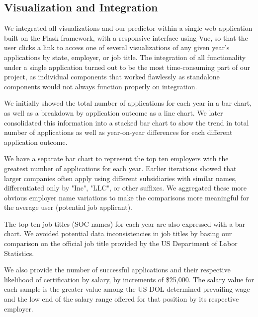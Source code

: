 \documentclass[sigconf]{acmart}
\begin{document}
\subsection{Visualization and Integration}
We integrated all visualizations and our predictor within a single 
web application built on the Flask framework, with a responsive interface using Vue, so that 
the user clicks a link to access one of several visualizations of any given year's applications 
by state, employer, or job title. The integration of all functionality under a single application 
turned out to be the most time-consuming part of our project, as individual components that worked 
flawlessly as standalone components would not always function properly on integration. 

We initially showed the total number of applications for each year in a bar chart, as well as a breakdown by application 
outcome as a line chart. We later consolidated this information into a stacked bar chart to show the trend in total number 
of applications as well as year-on-year differences for each different application outcome. 

We have a separate bar chart to represent the top ten employers with the greatest number of applications for each year. 
Earlier iterations showed that larger companies often apply using different subsidiaries with similar names, 
differentiated only by "Inc", "LLC", or other suffixes. We aggregated these more obvious employer name variations 
to make the comparisons more meaningful for the average user (potential job applicant). 

The top ten job titles (SOC names) for each year are also expressed with a bar chart. We avoided 
potential data inconsistencies in job titles by basing our comparison on the official job title provided 
by the US Department of Labor Statistics. 

We also provide the number of successful applications and their respective likelihood of certification 
by salary, by increments of \$25,000. The salary value for each sample is the greater value among 
the US DOL determined prevailing wage and the low end of the salary range offered for that position by 
its respective employer. 


\end{document}
